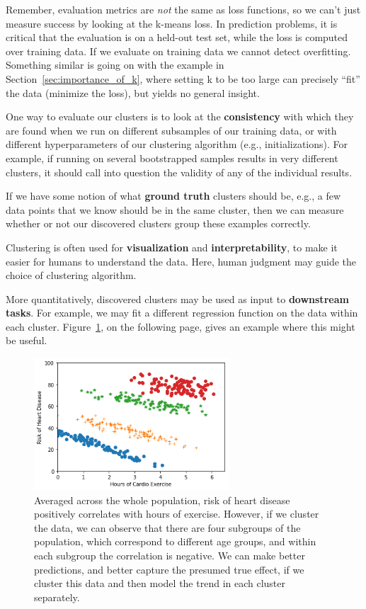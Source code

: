 \documentclass[11pt]{article}
\begin{document}
Remember, evaluation metrics are \textit{not} the same as loss functions, so we can't just measure success by looking at the k-means loss. In prediction problems, it is critical that the evaluation is on a held-out test set, while the loss is computed over training data. If we evaluate on training data we cannot detect overfitting. Something similar is going on with the example in Section~\ref{sec:importance_of_k}, where setting k to be too large can precisely ``fit'' the data (minimize the loss), but yields no general insight.

One way to evaluate our clusters is to look at the \textbf{consistency} with which they are found when we run on different subsamples of our training data, or with different hyperparameters of our clustering algorithm (e.g., initializations). For example, if running on several bootstrapped samples results in very different clusters, it should call into question the validity of any of the individual results. 

If we have some notion of what  \textbf{ground truth} clusters should be, e.g., a few data points that we know should be in the same cluster, then we can measure whether or not our discovered clusters group these examples correctly.

Clustering is often used for \textbf{visualization} and \textbf{interpretability}, to make it easier for humans to understand the data. Here, human judgment may guide the choice of clustering algorithm.

More quantitatively, discovered clusters may be used as input to \textbf{downstream tasks}. For example, we may fit a different regression function on the data within each cluster. Figure~\ref{fig:simpsons_color}, on the following page, gives an example where this might be useful.
\begin{figure}[h]
    \centering
    \includegraphics[width=0.65\textwidth]{figures/simpsons_color.png}
    \caption{Averaged across the whole population, risk of heart disease positively correlates with hours of exercise. However, if we cluster the data, we can observe that there are four subgroups of the population, which correspond to different age groups, and within each subgroup the correlation is negative. We can make better predictions, and better capture the presumed true effect, if we cluster this data and then model the trend in each cluster separately.}
    \label{fig:simpsons_color}
\end{figure}
\end{document}
